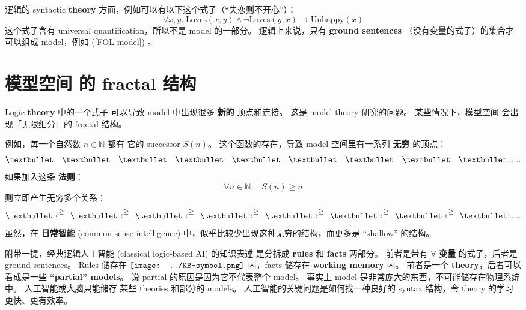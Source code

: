 \documentclass[12pt, orivec]{article}
\newcommand*\KB{\vcenter{\hbox{\texttt{[image: ../KB-symbol.png]}}}}
\begin{document}
逻辑的 syntactic \textbf{theory} 方面，例如可以有以下这个式子（``失恋则不开心''）：
\begin{equation}
\forall x,y. \; \mbox{Loves}(x,y) \wedge \neg \mbox{Loves}(y,x) \rightarrow \mbox{Unhappy}(x)
\end{equation}
这个式子含有 universal quantification，所以不是 model 的一部分。 逻辑上来说，只有 \textbf{ground sentences} （没有变量的式子）的集合才可以组成 model，例如 (\ref{FOL-model}) 。 

\section{模型空间 的 fractal 结构}

Logic \textbf{theory} 中的一个式子 可以导致 model 中出现很多 \textbf{新的} 顶点和连接。 这是 model theory 研究的问题。  某些情况下，模型空间 会出现「无限细分」的 fractal 结构。 

例如，每一个自然数 $n \in \mathbb{N}$ 都有 它的 successor $S(n)$。 这个函数的存在，导致 model 空间里有一系列 \textbf{无穷} 的顶点：
\begin{equation}
\textbullet \quad \textbullet \quad \textbullet \quad \textbullet \quad \textbullet \quad \textbullet \quad \textbullet \quad \textbullet \quad \textbullet \; .....
\end{equation}
如果加入这条 \textbf{法则}：
\begin{equation}
\forall n \in \mathbb{N}. \quad S(n) \ge n
\end{equation}
则立即产生无穷多个关系：
\begin{equation}
\textbullet \stackrel{\ge}{\longleftarrow} \textbullet \stackrel{\ge}{\longleftarrow} \textbullet \stackrel{\ge}{\longleftarrow} \textbullet \stackrel{\ge}{\longleftarrow} \textbullet \stackrel{\ge}{\longleftarrow} \textbullet \stackrel{\ge}{\longleftarrow} \textbullet \stackrel{\ge}{\longleftarrow} \textbullet \; .....
\end{equation}
虽然，在 \textbf{日常智能} (common-sense intelligence) 中，似乎比较少出现这种无穷的结构，而更多是 ``shallow'' 的结构。 

附带一提，经典逻辑人工智能 (classical logic-based AI) 的知识表述 是分拆成 \textbf{rules} 和 \textbf{facts} 两部分。 前者是带有 $\forall$ \textbf{变量} 的式子，后者是 ground sentences。  Rules 储存在 $\KB$ 内，facts 储存在 \textbf{working memory} 内。 前者是一个 \textbf{theory}，后者可以看成是一些 \textbf{``partial'' models}。  说 partial 的原因是因为它不代表整个 model。  事实上 model 是非常庞大的东西，不可能储存在物理系统中。  人工智能或大脑只能储存 某些 theories 和部分的 models。  人工智能的关键问题是如何找一种良好的 syntax 结构，令 theory 的学习更快、更有效率。 
\end{document}
